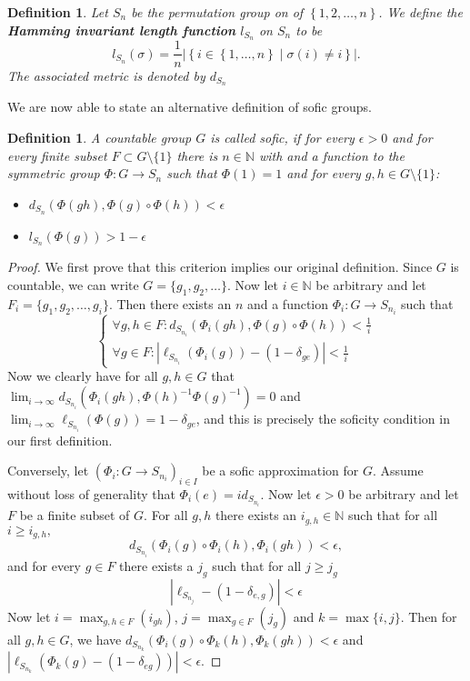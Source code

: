 \documentclass[titlepage, a4paper]{article}
\newcommand{\N}{\mathbb{N}}
\newcommand{\card}[1]{\left| #1 \right|}
\newtheorem{definition}[theorem]{Definition}
\theoremstyle{remark}
\begin{document}
	\begin{definition}
		Let $S_n$ be the permutation group on of $\left\{ 1,2,\ldots,n \right\} $. 
		We define the \textbf{Hamming invariant length function} $l_{S_n}$ on $S_n$ to be \[
			l_{S_n}(\sigma) = \frac{1}{n} \card{\left\{ i \in \left\{ 1, \ldots, n \right\} \mid \sigma(i)\ne i \right\} }
		.\] 
		The associated metric is denoted by $d_{S_n}$
	\end{definition}
	We are now able to state an alternative definition of sofic groups.
	\begin{definition} %
		A countable group $G$ is called sofic, if for every $\epsilon > 0$ and for every finite subset  $F \subset G\setminus\{1\}$ there is $n \in \N$ with and a function to the symmetric group $\Phi: G \to S_n$ such that $\Phi(1) = 1$ and for every  $g, h \in G\setminus \{1\} $:
		\begin{itemize}
			\item $d_{S_n}\left( \Phi(gh), \Phi(g) \circ \Phi(h) \right) < \epsilon$
			\item $l_{S_n} \left( \Phi(g) \right) > 1-\epsilon$
		\end{itemize}
	\end{definition}

    \begin{proof}
    We first prove that this criterion implies our original definition. Since $G$ is countable, we can write $G = \{g_1, g_2, \dots\}$. Now let $i \in \N$ be arbitrary and let $F_i = \{ g_1, g_2, \dots, g_i\}$. Then there exists an $n$ and a function $\Phi_i: G \to S_{n_i}$ such that
    \[
        \begin{cases}
        \forall g, h \in F: d_{S_{n_i}}(\Phi_i(gh), \Phi(g) \circ \Phi(h)) < \frac 1 i \\
        \forall g \in F: \left|\ell_{S_{n_i}}(\Phi_i(g)) - (1 - \delta_{ge}) \right|< \frac 1 i
        \end{cases}
   \]
   Now we clearly have for all $g,h \in G$ that $\lim_{i \to \infty} d_{S_{n_i}}(\Phi_i(gh), \Phi(h)^{-1} \Phi(g)^{-1}) = 0$ and $\lim_{i \to \infty} \ell_{S_{n_i}}(\Phi(g)) = 1 - \delta_{ge}$,  and this is precisely the soficity condition in our first definition.

   Conversely, let $\left(\Phi_i: G \to S_{n_i} \right)_{i \in I}$ be a sofic approximation for $G$. Assume without loss of generality that $\Phi_i(e) = id_{S_{n_i}}$. Now let $\epsilon > 0$ be arbitrary and let $F$ be a finite subset of $G$.
   For all $g,h$ there exists an $i_{g,h} \in \N$ such that for all $i \geq i_{g,h},$
   \[
   d_{S_{n_i}}(\Phi_i(g) \circ \Phi_i(h), \Phi_i(gh)) < \epsilon,
   \]
   and for every $g \in F$ there exists a $j_g$ such that for all $j \geq j_g$
   \[
        \left| \ell_{S_{n_j}} - (1-\delta_{e,g}) \right| < \epsilon
   \]
   Now let $i = \max_{g,h \in F}(i_{gh})$, $j = \max_{g \in F}(j_g)$ and $k = \max\{i,j\}$.
   Then for all $g,h \in G$, we have
   $ d_{S_{n_k}}(\Phi_i(g) \circ \Phi_k(h), \Phi_k(gh)) < \epsilon$ and $\left| \ell_{S_{n_k}} (\Phi_k(g) - (1- \delta_{eg})) \right| < \epsilon$.

    \end{proof}
\end{document}
